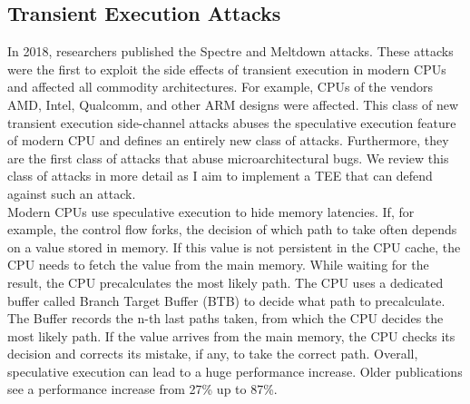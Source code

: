 \subsection{Transient Execution Attacks}
\label{sec:20:transientattacks}
In 2018, researchers published the Spectre and Meltdown
attacks.\cite{kocher_spectre_2020, lipp_meltdown_2020} These attacks were the
first to exploit the side effects of transient execution in modern CPUs and
affected all commodity architectures. For example, CPUs of the vendors AMD,
Intel, Qualcomm, and other ARM designs were affected. This class of new
transient execution side-channel attacks abuses the speculative execution
feature of modern CPU and defines an entirely new class of attacks. Furthermore,
they are the first class of attacks that abuse microarchitectural bugs. We
review this class of attacks in more detail as I aim to implement a TEE that
can defend against such an attack.\\

Modern CPUs use speculative execution to hide memory latencies. If, for example,
the control flow forks, the decision of which path to take often depends on a
value stored in memory. If this value is not persistent in the CPU cache, the
CPU needs to fetch the value from the main memory. While waiting for the result,
the CPU precalculates the most likely path. The CPU uses a dedicated buffer
called Branch Target Buffer (BTB) to decide what path to precalculate. The
Buffer records the n-th last paths taken, from which the CPU decides the most
likely path. If the value arrives from the main memory, the CPU checks its
decision and corrects its mistake, if any, to take the correct path. Overall,
speculative execution can lead to a huge performance increase. Older
publications see a performance increase from 27\% up to
87\%.\cite{espasa1997out, mock2005empirical}\\

